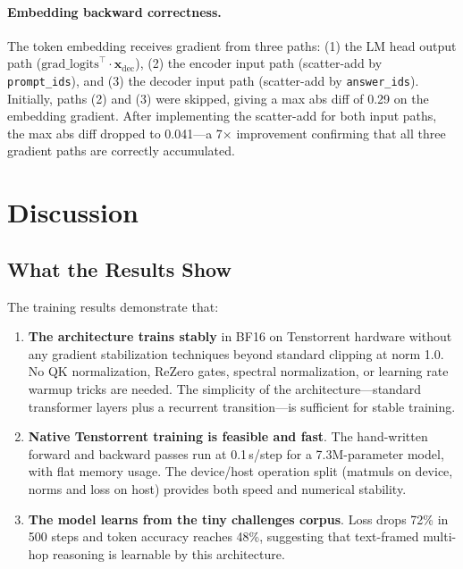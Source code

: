 \documentclass[11pt,a4paper]{article}
\begin{document}
\paragraph{Embedding backward correctness.}
The token embedding receives gradient from three paths: (1) the LM head output path ($\text{grad\_logits}^\top \cdot \mathbf{x}_{\text{dec}}$), (2) the encoder input path (scatter-add by \texttt{prompt\_ids}), and (3) the decoder input path (scatter-add by \texttt{answer\_ids}). Initially, paths (2) and (3) were skipped, giving a max abs diff of 0.29 on the embedding gradient. After implementing the scatter-add for both input paths, the max abs diff dropped to 0.041---a 7$\times$ improvement confirming that all three gradient paths are correctly accumulated.

\section{Discussion}
\label{sec:discussion}

\subsection{What the Results Show}

The training results demonstrate that:

\begin{enumerate}[nosep]
    \item \textbf{The architecture trains stably} in BF16 on Tenstorrent hardware without any gradient stabilization techniques beyond standard clipping at norm 1.0. No QK normalization, ReZero gates, spectral normalization, or learning rate warmup tricks are needed. The simplicity of the architecture---standard transformer layers plus a recurrent transition---is sufficient for stable training.
    \item \textbf{Native Tenstorrent training is feasible and fast}. The hand-written forward and backward passes run at 0.1\,s/step for a 7.3M-parameter model, with flat memory usage. The device/host operation split (matmuls on device, norms and loss on host) provides both speed and numerical stability.
    \item \textbf{The model learns from the tiny challenges corpus}. Loss drops 72\% in 500 steps and token accuracy reaches 48\%, suggesting that text-framed multi-hop reasoning is learnable by this architecture.
\end{enumerate}
\end{document}
